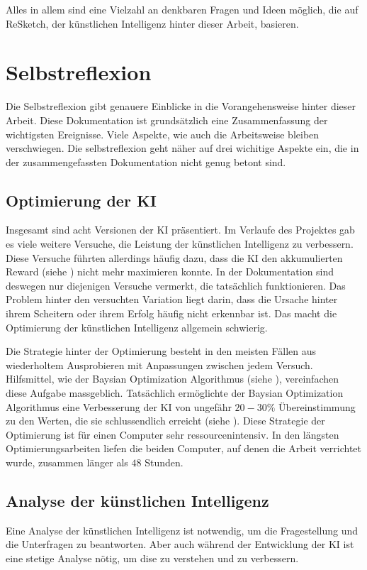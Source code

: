 Alles in allem sind eine Vielzahl an denkbaren Fragen und Ideen möglich, die auf
ReSketch, der künstlichen Intelligenz hinter dieser Arbeit, basieren.


\section{Selbstreflexion}
\label{chap:d_reflex}
Die Selbstreflexion gibt genauere Einblicke in die Vorangehensweise hinter
dieser Arbeit. Diese Dokumentation ist grundsätzlich eine Zusammenfassung der wichtigsten
Ereignisse. Viele Aspekte, wie auch die Arbeitsweise bleiben verschwiegen. Die
selbstreflexion geht näher auf drei wichitige Aspekte ein, die in der
zusammengefassten Dokumentation nicht genug betont sind.

\subsection{Optimierung der KI}
\label{sub:d_reflex_opti}
Insgesamt sind acht Versionen der KI präsentiert. Im Verlaufe des Projektes gab
es viele weitere Versuche, die Leistung der künstlichen Intelligenz zu
verbessern. Diese Versuche führten allerdings häufig dazu, dass die KI den
akkumulierten Reward (siehe ) nicht mehr maximieren
konnte. In der Dokumentation sind deswegen nur diejenigen Versuche vermerkt, die
tatsächlich funktionieren. Das Problem hinter den versuchten Variation liegt
darin, dass die Ursache hinter ihrem Scheitern oder ihrem Erfolg häufig nicht
erkennbar ist. Das macht die Optimierung der künstlichen Intelligenz allgemein
schwierig. 

Die Strategie hinter der Optimierung besteht in den meisten Fällen aus
wiederholtem Ausprobieren mit Anpassungen zwischen jedem Versuch. Hilfsmittel,
wie der Baysian Optimization Algorithmus (siehe ),
vereinfachen diese Aufgabe massgeblich. Tatsächlich ermöglichte der Baysian
Optimization Algorithmus eine Verbesserung der KI von ungefähr $20-30\%$
Übereinstimmung zu den Werten, die sie schlussendlich erreicht (siehe
). Diese Strategie der Optimierung ist für einen Computer
sehr ressourcenintensiv. In den längsten Optimierungsarbeiten liefen die beiden
Computer, auf denen die Arbeit verrichtet wurde, zusammen länger als $48$
Stunden.

\subsection{Analyse der künstlichen Intelligenz}
\label{sub:d_reflex_analys}
Eine Analyse der künstlichen Intelligenz ist notwendig, um die Fragestellung und
die Unterfragen zu beantworten. Aber auch während der Entwicklung der
KI ist eine stetige Analyse nötig, um dise zu verstehen und
zu verbessern.

